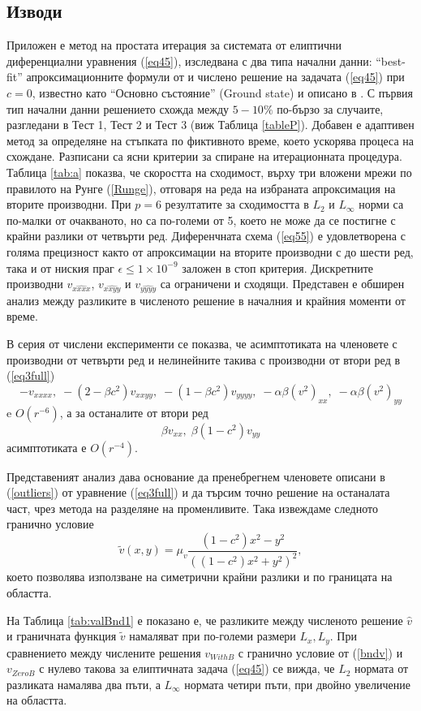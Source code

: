 \documentclass[a4paper]{article}
\newcommand{\be}{\begin{equation}}
\newcommand{\ee}{\end{equation}}
\newcommand{\rf}[1]{(\ref{#1})}
\theoremstyle{remark}
\begin{document}
\begin{large}
\subsection{Изводи}
Приложен е метод на простата итерация за системата от елиптични диференциални уравнения  \rf{eq45}, изследвана с два типа начални данни:  ``best-fit'' апроксимационните формули от \cite{ref15} и числено решение на задачата \rf{eq45} при $c=0$, известно като ``Основно състояние'' (Ground state) и описано в \cite{ref1c0, ref2c0}. С първия тип начални данни решението схожда между $5-10\%$ по-бързо за случаите, разгледани в Тест 1, Тест 2 и Тест 3 (виж Таблица \ref{tableP}). Добавен е адаптивен метод за определяне на стъпката по фиктивното време, което ускорява процеса на схождане. Разписани са ясни критерии за спиране на итерационната процедура. Таблица \ref{tab:a} 
показва, че скоростта на сходимост, върху три вложени мрежи по правилото на Рунге \rf{Runge}, отговаря на реда на избраната апроксимация на вторите производни. При $p=6$ резултатите за сходимостта в $L_2$ и $L_\infty$ норми са по-малки от очакваното, но са по-големи от 5, което не може да се постигне с крайни разлики от четвърти ред. Диференчната схема \rf{eq55} е удовлетворена с голяма прецизност както от апроксимации на вторите производни с до шести ред, така и от ниския праг $\epsilon \le 1\times10^{-9}$ заложен в стоп критерия.  Дискретните производни $v_{\widehat{xxxx}}$, $v_{\widehat{xxyy}}$ и  $v_{\widehat{yyyy}}$ са ограничени и сходящи. Представен е обширен анализ между разликите в численото решение в началния и крайния моменти от време. 

В серия от числени експерименти се показва, че асимптотиката на членовете с производни от четвърти ред и нелинейните такива с производни от втори ред в \rf{eq3full}
\be
- v_{xxxx}, \;  - (2-\beta c^2)v_{xxyy},  \;  - (1-\beta c^2)v_{yyyy}, \;  - \alpha \beta (v^2)_{xx}, \; - \alpha \beta (v^2)_{yy}
\ee
e $O(r^{-6})$, а за останалите от втори ред
$$
\beta v_{xx}, \; \beta (1-c^2) v_{yy}
$$
асимптотиката е $O(r^{-4})$. 

Представеният анализ дава основание да пренебрегнем членовете описани в \rf{outliers} от уравнение \rf{eq3full} и да търсим точно решение на останалата част, чрез метода на разделяне на променливите. Така извеждаме следното гранично условие
\be
\tilde v(x, y) = \mu_v \frac{ (1-c^2) x^2 - y^2 }{ ((1-c^2) x^2 + y^2)^2 },
\ee
което позволява използване на симетрични крайни разлики и по границата на областта.

На Таблица \ref{tab:valBnd1} е показано е, че разликите между численото решение $\widehat v$ и граничната функция $\tilde v$ намаляват при по-големи размери $L_x, L_y$. При сравнението между числените решения $v_{WithB}$ с гранично условие от \rf{bndv} и $v_{ZeroB}$ с нулево такова за елиптичната задача \rf{eq45} се вижда, че $L_2$ нормата от разликата намалява два пъти, а $L_\infty$ нормата четири пъти, при двойно увеличение на областта. 


\end{large}
\end{document}
